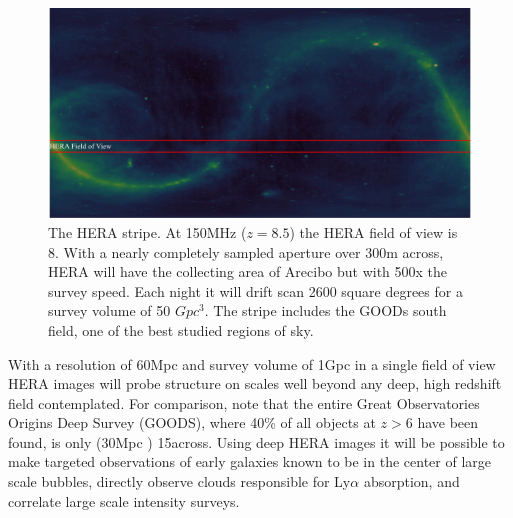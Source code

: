 \documentclass[preprint]{aastex}
\begin{document}
\begin{figure}[t]\centering
\includegraphics[width=\textwidth]{plots/Imaging/HERA_FoV.jpg}
\caption{The HERA stripe.  At 150MHz ($z=8.5$) the HERA field of view is 8\arcdeg.  With a nearly completely sampled aperture over 300m across, HERA will have the collecting area of Arecibo but with 500x the survey speed. Each night it will drift scan 2600 square degrees for a survey volume of 50 $Gpc^3$.  The stripe includes the GOODs south field, one of the best studied regions of sky. \label{fig:HERA_FoV}}
\end{figure}

With a resolution of 60Mpc and survey volume of 1Gpc in a single field of view HERA images will probe structure on scales well beyond any deep, high redshift field contemplated. For comparison, note that the entire Great Observatories Origins Deep Survey (GOODS), where 40\% of all objects at $z > 6$ have been found, is only (30Mpc ) 15\arcmin  across. Using deep HERA images it will be possible to make targeted observations of early galaxies known to be in the center of large scale bubbles, directly observe clouds responsible for Ly$\alpha$ absorption, and correlate large scale intensity surveys.
\end{document}
